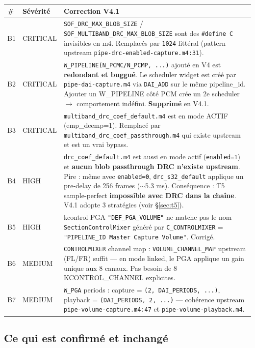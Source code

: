 \documentclass[11pt,a4paper]{article}
\begin{document}
\begin{center}
\begin{tabularx}{\textwidth}{llX}
\toprule
\textbf{\#} & \textbf{Sévérité} & \textbf{Correction V4.1} \\
\midrule
B1 & CRITICAL & \texttt{SOF\_DRC\_MAX\_BLOB\_SIZE} / \texttt{SOF\_MULTIBAND\_DRC\_MAX\_BLOB\_SIZE} sont des \texttt{\#define C} invisibles en m4. Remplacés par \texttt{1024} littéral (pattern upstream \texttt{pipe-drc-enabled-capture.m4:31}). \\
B2 & CRITICAL & \texttt{W\_PIPELINE(N\_PCMC/N\_PCMP, ...)} ajouté en V4 est \textbf{redondant et buggué}. Le scheduler widget est créé par \texttt{pipe-dai-capture.m4} via \texttt{DAI\_ADD} sur le même pipeline\_id. Ajouter un W\_PIPELINE côté PCM crée un 2e scheduler $\to$ comportement indéfini. \textbf{Supprimé} en V4.1. \\
B3 & CRITICAL & \texttt{multiband\_drc\_coef\_default.m4} est en mode ACTIF (emp\_deemp=1). Remplacé par \texttt{multiband\_drc\_coef\_passthrough.m4} qui existe upstream et est un vrai bypass. \\
B4 & HIGH & \texttt{drc\_coef\_default.m4} est aussi en mode actif (\texttt{enabled=1}) et \textbf{aucun blob passthrough DRC n'existe upstream}. Pire : même avec \texttt{enabled=0}, \texttt{drc\_s32\_default} applique un pre-delay de 256 frames ($\sim$5.3 ms). Conséquence : T5 sample-perfect \textbf{impossible avec DRC dans la chaîne}. V4.1 adopte 3 stratégies (voir \S\ref{sec:t5}). \\
B5 & HIGH & kcontrol PGA \texttt{"DEF\_PGA\_VOLUME"} ne matche pas le nom \texttt{SectionControlMixer} généré par \texttt{C\_CONTROLMIXER} = \texttt{"PIPELINE\_ID Master Capture Volume"}. Corrigé. \\
B6 & MEDIUM & \texttt{CONTROLMIXER} channel map : \texttt{VOLUME\_CHANNEL\_MAP} upstream (FL/FR) suffit --- en mode linked, le PGA applique un gain unique aux 8 canaux. Pas besoin de 8 KCONTROL\_CHANNEL explicites. \\
B7 & MEDIUM & \texttt{W\_PGA} periods : capture = \texttt{(2, DAI\_PERIODS, ...)}, playback = \texttt{(DAI\_PERIODS, 2, ...)} --- cohérence upstream \texttt{pipe-volume-capture.m4:47} et \texttt{pipe-volume-playback.m4}. \\
\bottomrule
\end{tabularx}
\end{center}

\subsection{Ce qui est confirmé et inchangé}
\end{document}
